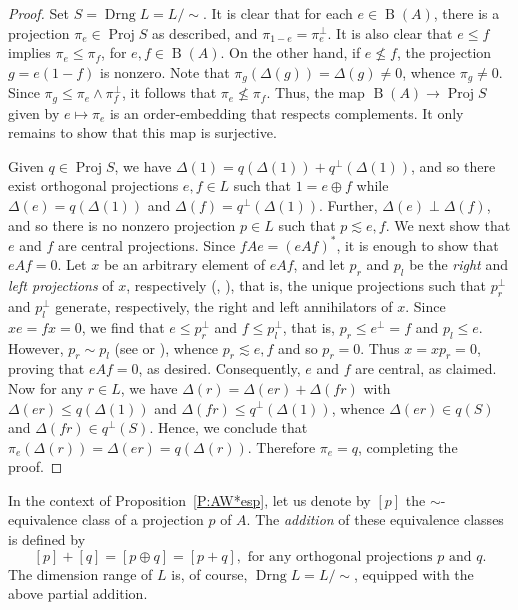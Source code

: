 \documentclass[psamsfonts,reqno]{memo-l}
\theoremstyle{plain}
\theoremstyle{definition}
\theoremstyle{remark}
\numberwithin{equation}{section}
\DeclareMathOperator{\rB}{B}
\DeclareMathOperator{\BB}{Proj}
\DeclareMathOperator{\Drng}{Drng}
\begin{document}
\begin{proof} Set $S= \Drng L= L/{\sim}$. It is clear that for each $e\in
\rB(A)$, there is a projection $\pi_e\in \BB S$\index{pzzroj@$\BB{S}$} as
described, and
$\pi_{1-e}= \pi_e^\perp$. It is also clear that $e\leq f$ implies
$\pi_e\leq \pi_f$, for $e,f\in \rB(A)$. On the other hand, if $e\nleq f$,
the projection $g= e(1-f)$ is nonzero. Note that $\pi_g(\Delta(g))=
\Delta(g)\ne 0$, whence $\pi_g\ne 0$. Since $\pi_g\leq \pi_e\wedge
\pi_f^\perp$, it follows that $\pi_e \nleq \pi_f$. Thus, the map
$\rB(A)\rightarrow \BB S$ given by $e\mapsto \pi_e$ is an order-embedding
that respects complements. It only remains to show that this map is
surjective.

Given\index{pzzroj@$\BB{S}$} $q\in\BB S$, we have
$\Delta(1)=q(\Delta(1))+q^\perp(\Delta(1))$, and so there exist orthogonal
projections $e,f\in L$ such that $1= e\oplus f$ while $\Delta(e)=
q(\Delta(1))$ and $\Delta(f)= q^\perp(\Delta(1))$. Further, $\Delta(e)\perp
\Delta(f)$, and so there is no nonzero projection
$p\in L$ such that $p\lesssim e,f$. We next show that $e$ and $f$ are central
projections. Since $fAe= (eAf)^*$, it is enough to show that $eAf=0$. Let
$x$ be an arbitrary element of $eAf$, and let
$p_r$ and $p_l$ be the \emph{right} and \emph{left projections} of $x$,
respectively (\cite[\S3, Definition 4]{Berb},
\cite[p.~28]{Kapl68}), that is, the unique projections
such that $p_r^\perp$ and $p_l^\perp$ generate, respectively, the right and
left annihilators of
$x$. Since $xe=fx=0$, we find that $e\le p_r^\perp$ and
$f\le p_l^\perp$, that is, $p_r\le e^\perp= f$ and $p_l\le e$. However,
$p_r\sim p_l$ (see
\cite[\S20, Theorem~3]{Berb} or
\cite[Theorem~63]{Kapl68}), whence
$p_r\lesssim e,f$ and so $p_r=0$. Thus $x=xp_r=0$, proving that $eAf=0$,
as desired. Consequently, $e$ and $f$ are central, as claimed. Now
for any $r\in L$, we have $\Delta(r)= \Delta(er)+ \Delta(fr)$ with
$\Delta(er)\leq q(\Delta(1))$ and $\Delta(fr)\leq q^\perp(\Delta(1))$,
whence $\Delta(er)\in q(S)$ and $\Delta(fr)\in q^\perp(S)$.
Hence, we conclude that $\pi_e(\Delta(r))= \Delta(er)= q(\Delta(r))$.
Therefore $\pi_e= q$, completing the proof.
\end{proof}

In the context of Proposition~\ref{P:AW*esp}, let us denote by $[p]$ the
$\sim$-equivalence class of a projection $p$ of $A$.
The \emph{addition} of these equivalence classes is defined by
   \[
   [p]+[q]=[p\oplus q]=[p+q],
   \text{ for any orthogonal projections }p\text{ and }q.
   \]
The dimension range of $L$ is, of
course,\index{Dzzrng@$\Drng L$} $\Drng L=L/{\sim}$, equipped with the above
partial addition.
\end{document}
